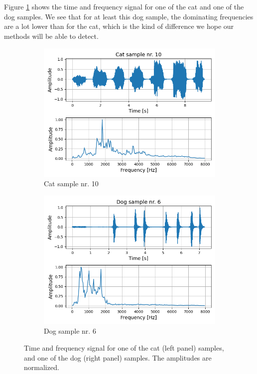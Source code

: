 \documentclass[a4paper]{article}
\begin{document}
\\\\
Figure \ref{fig:cat_dog_samples} shows the time and frequency signal for one of the cat and one of the dog samples. We see that for at least this dog sample, the dominating frequencies are a lot lower than for the cat, which is the kind of difference we hope our methods will be able to detect.
\begin{figure}[H]
	\centering
	\begin{subfigure}{0.49\textwidth}
		\includegraphics[scale=0.45]{../figures/cat_10_nbins200.png}
		\caption{Cat sample nr. 10}
	\end{subfigure}
	\begin{subfigure}{0.49\textwidth}
		\includegraphics[scale=0.45]{../figures/dog_6_nbins200.png}
		\caption{Dog sample nr. 6}
	\end{subfigure}
	\caption{Time and frequency signal for one of the cat (left panel) samples, and one of the dog (right panel) samples. The amplitudes are normalized.}
	\label{fig:cat_dog_samples}
\end{figure}
\end{document}

